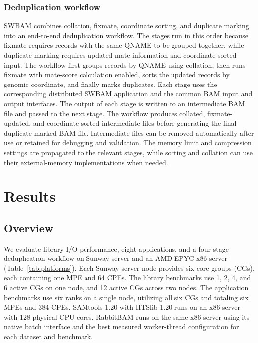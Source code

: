 \documentclass[lettersize,journal]{IEEEtran}
\begin{document}
\subsubsection{Deduplication workflow}
SWBAM combines collation, fixmate, coordinate sorting, and duplicate marking into an end-to-end deduplication workflow.
The stages run in this order because fixmate requires records with the same QNAME to be grouped together, while duplicate marking requires updated mate information and coordinate-sorted input.
The workflow first groups records by QNAME using collation, then runs fixmate with mate-score calculation enabled, sorts the updated records by genomic coordinate, and finally marks duplicates.
Each stage uses the corresponding distributed SWBAM application and the common BAM input and output interfaces.
The output of each stage is written to an intermediate BAM file and passed to the next stage.
The workflow produces collated, fixmate-updated, and coordinate-sorted intermediate files before generating the final duplicate-marked BAM file.
Intermediate files can be removed automatically after use or retained for debugging and validation.
The memory limit and compression settings are propagated to the relevant stages, while sorting and collation can use their external-memory implementations when needed.

\section{Results}
\subsection{Overview}
We evaluate library I/O performance, eight applications, and a four-stage deduplication workflow on Sunway server and an AMD EPYC x86 server (Table~\ref{tab:platforms}).
Each Sunway server node provides six core groups (CGs), each containing one MPE and 64 CPEs.
The library benchmarks use 1, 2, 4, and 6 active CGs on one node, and 12 active CGs across two nodes.
The application benchmarks use six ranks on a single node, utilizing all six CGs and totaling six MPEs and 384 CPEs.
SAMtools 1.20 with HTSlib 1.20 runs on an x86 server with 128 physical CPU cores.
RabbitBAM runs on the same x86 server using its native batch interface and the best measured worker-thread configuration for each dataset and benchmark.
\end{document}
